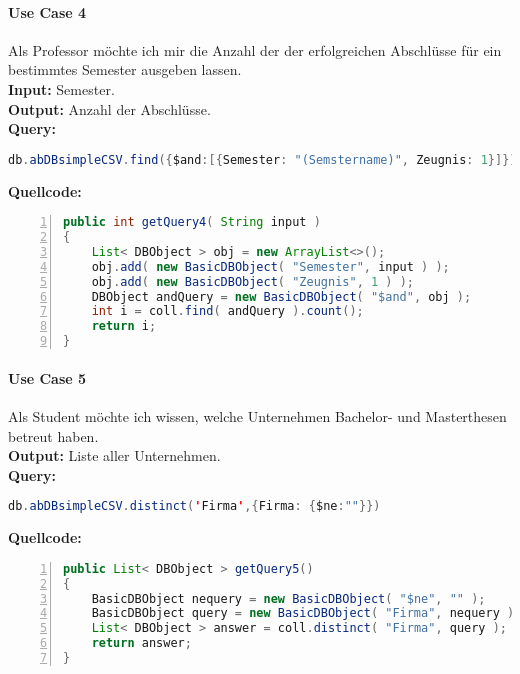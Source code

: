 \paragraph{Use Case 4} Als Professor möchte ich mir die Anzahl der der erfolgreichen Abschlüsse für ein bestimmtes Semester ausgeben lassen. \\
\textbf{Input:} Semester. \\
\textbf{Output:} Anzahl der Abschlüsse. \\
\textbf{Query:}

\begin{lstlisting}[caption={Query zu Use Case 4},language=java,captionpos=t,numbers=none, numberstyle=\tiny,basicstyle=\scriptsize,breaklines=true]
db.abDBsimpleCSV.find({$and:[{Semester: "(Semstername)", Zeugnis: 1}]}).count()
\end{lstlisting}\label{lst:query4}

\textbf{Quellcode:}

\begin{lstlisting}[caption={Quellcode zu Use Case 4},language=java,captionpos=t,numbers=left, numberstyle=\tiny,basicstyle=\scriptsize,breaklines=true]
public int getQuery4( String input )
{
    List< DBObject > obj = new ArrayList<>();
    obj.add( new BasicDBObject( "Semester", input ) );
    obj.add( new BasicDBObject( "Zeugnis", 1 ) );
    DBObject andQuery = new BasicDBObject( "$and", obj );
    int i = coll.find( andQuery ).count();
    return i;
}
\end{lstlisting}\label{lst:query4code}

\paragraph{Use Case 5} Als Student möchte ich wissen, welche Unternehmen Bachelor- und Masterthesen betreut haben. \\
\textbf{Output:} Liste aller Unternehmen. \\
\textbf{Query:}

\begin{lstlisting}[caption={Query zu Use Case 5},language=java,captionpos=t,numbers=none, numberstyle=\tiny,basicstyle=\scriptsize,breaklines=true]
db.abDBsimpleCSV.distinct('Firma',{Firma: {$ne:""}})
\end{lstlisting}\label{lst:query5}

\textbf{Quellcode:}

\begin{lstlisting}[caption={Quellcode zu Use Case 5},language=java,captionpos=t,numbers=left, numberstyle=\tiny,basicstyle=\scriptsize,breaklines=true]
public List< DBObject > getQuery5()
{
    BasicDBObject nequery = new BasicDBObject( "$ne", "" );
    BasicDBObject query = new BasicDBObject( "Firma", nequery );
    List< DBObject > answer = coll.distinct( "Firma", query );
    return answer;
}
\end{lstlisting}\label{lst:query5code}

